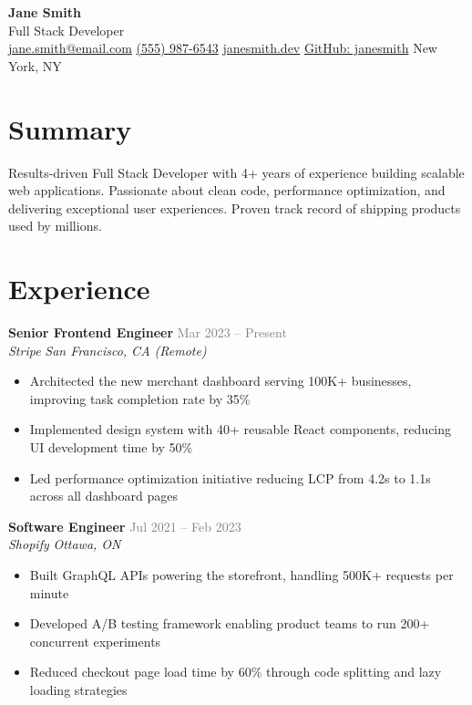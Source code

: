 \documentclass[11pt,a4paper]{article}
\begin{document}
\begin{center}
  {\fontsize{28}{34}\selectfont\bfseries\color{darktext} Jane Smith} \\[8pt]
  {\large\color{awesome} Full Stack Developer} \\[6pt]
  \small\color{graytext}
  \href{mailto:jane.smith@email.com}{jane.smith@email.com} \quad
  \href{tel:+15559876543}{(555) 987-6543} \quad
  \href{https://janesmith.dev}{janesmith.dev} \quad
  \href{https://github.com/janesmith}{GitHub: janesmith} \quad
  New York, NY
\end{center}
\vspace{4pt}

\section{Summary}
\color{darktext}
Results-driven Full Stack Developer with 4+ years of experience building scalable web applications. Passionate about clean code, performance optimization, and delivering exceptional user experiences. Proven track record of shipping products used by millions.

\section{Experience}
\vspace{2pt}

\noindent\textbf{\color{darktext}Senior Frontend Engineer} \hfill \textcolor{graytext}{Mar 2023 -- Present} \\
\textit{\color{awesome}Stripe} \hfill \textit{\color{lighttext}San Francisco, CA (Remote)}
\begin{itemize}[leftmargin=1.5em, topsep=2pt, itemsep=1pt]
  \item Architected the new merchant dashboard serving 100K+ businesses, improving task completion rate by 35\%
  \item Implemented design system with 40+ reusable React components, reducing UI development time by 50\%
  \item Led performance optimization initiative reducing LCP from 4.2s to 1.1s across all dashboard pages
\end{itemize}
\vspace{4pt}

\noindent\textbf{\color{darktext}Software Engineer} \hfill \textcolor{graytext}{Jul 2021 -- Feb 2023} \\
\textit{\color{awesome}Shopify} \hfill \textit{\color{lighttext}Ottawa, ON}
\begin{itemize}[leftmargin=1.5em, topsep=2pt, itemsep=1pt]
  \item Built GraphQL APIs powering the storefront, handling 500K+ requests per minute
  \item Developed A/B testing framework enabling product teams to run 200+ concurrent experiments
  \item Reduced checkout page load time by 60\% through code splitting and lazy loading strategies
\end{itemize}
\vspace{4pt}
\end{document}
